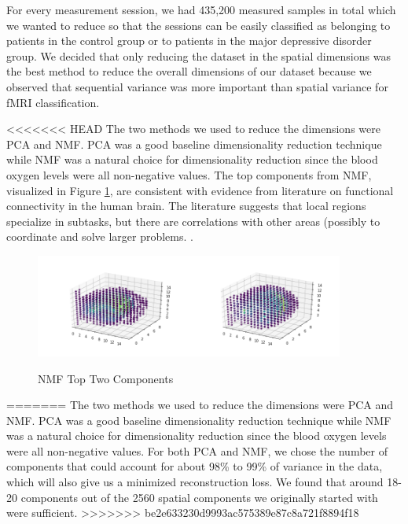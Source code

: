 \documentclass{article}[12pt]
\begin{document}
   For every measurement session, we had 435,200 measured samples in total which we wanted to reduce so that the sessions can be easily classified as belonging to patients in the control group or to patients in the major depressive disorder group. We decided that only reducing the dataset in the spatial dimensions was the best method to reduce the overall dimensions of our dataset because we observed that sequential variance was more important than spatial variance for fMRI classification. 
   
<<<<<<< HEAD
   The two methods we used to reduce the dimensions were PCA and NMF. PCA was a good baseline dimensionality reduction technique while NMF was a natural choice for dimensionality reduction since the blood oxygen levels were all non-negative values.  The top components from NMF, visualized in Figure \ref{fig:nmf}, are consistent with evidence from literature on functional connectivity in the human brain.  The literature suggests that local regions specialize in subtasks, but there are correlations with other areas (possibly to coordinate and solve larger problems. \cite{shine2016temporal}.
   
   \begin{figure}[!htb]
   	\centering
   	\includegraphics[width=2in]{nmf1}\includegraphics[width=2in]{nmf2}
   	\caption{NMF Top Two Components}
   	\label{fig:nmf}
   \end{figure}
=======
   The two methods we used to reduce the dimensions were PCA and NMF. PCA was a good baseline dimensionality reduction technique while NMF was a natural choice for dimensionality reduction since the blood oxygen levels were all non-negative values. For both PCA and NMF, we chose the number of components that could account for about 98\% to 99\% of variance in the data, which will also give us a minimized reconstruction loss. We found that around 18-20 components out of the 2560 spatial components we originally started with were sufficient. 
>>>>>>> be2e633230d9993ac575389e87c8a721f8894f18
   
\end{document}
